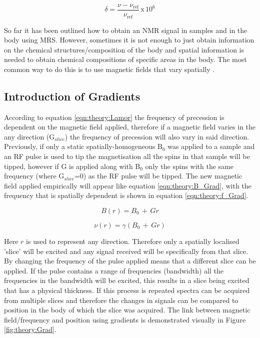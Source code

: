 \documentclass[class=article, crop=false]{standalone}
\begin{document}
\begin{equation}
    \delta = \frac{\nu - \nu_{\textrm{ref}}}{\nu_\textrm{ref}} \, \textrm{x} \, 10^6
    \label{eqn:theory:chemshift}
\end{equation}

So far it has been outlined how to obtain an NMR signal in samples and in the body using MRS. However, sometimes it is not enough to just obtain information on the chemical structures/composition of the body and spatial information is needed to obtain chemical compositions of specific areas in the body. The most common way to do this is to use magnetic fields that vary spatially \cite{Haacke2014MagneticDesign}. 

\subsection{Introduction of Gradients}

According to equation \ref{eqn:theory:Lamor} the frequency of precession is dependent on the magnetic field applied, therefore if a magnetic field varies in the any direction (G$_{slice}$) the frequency of precession will also vary in said direction. Previously, if only a static spatially-homogeneous B$_0$ was applied to a sample and an RF pulse is used to tip the magnetisation all the spins in that sample will be tipped, however if G is applied along with B$_0$ only the spins with the same frequency (where G$_{slice}$=0) as the RF pulse will be tipped. The new magnetic field applied empirically will appear like equation \ref{eqn:theory:B_Grad}, with the frequency that is spatially dependent is shown in equation \ref{eqn:theory:f_Grad}.

\begin{equation}
    B(r) = B_0 \, + \, Gr
    \label{eqn:theory:B_Grad}
\end{equation}

\begin{equation}
    \nu(r) = \gamma(B_0 \, + \, Gr)
    \label{eqn:theory:f_Grad}
\end{equation}

Here $r$ is used to represent any direction. Therefore only a spatially localised 'slice' will be excited and any signal received will be specifically from that slice. By changing the frequency of the pulse applied means that a different slice can be applied. If the pulse contains a range of frequencies (bandwidth) all the frequencies in the bandwidth will be excited, this results in a slice being excited that has a physical thickness. If this process is repeated spectra can be acquired from multiple slices and therefore the changes in signals can be compared to position in the body of which the slice was acquired. The link between magnetic field/frequency and position using gradients is demonstrated visually in Figure \ref{fig:theory:Grad}.
\end{document}
